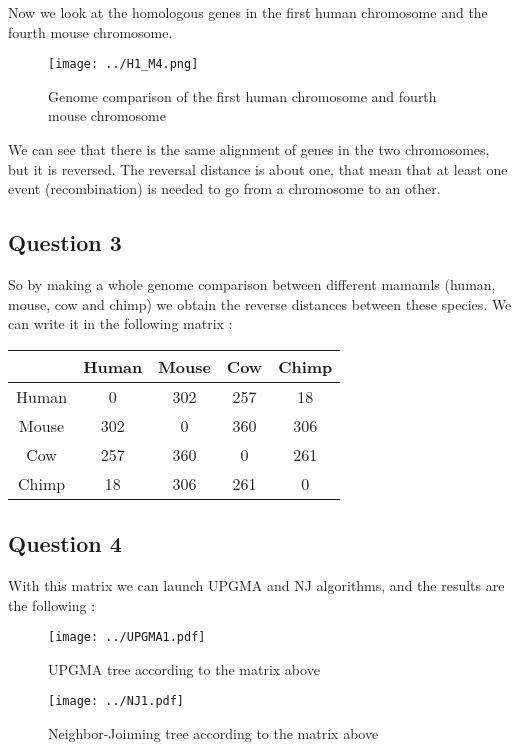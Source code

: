 \documentclass[]{article}
\theoremstyle{definition}
\begin{document}
Now we look at the homologous genes in the first human chromosome and the fourth mouse chromosome.
\begin{figure}[H]
	\texttt{[image: ../H1\_M4.png]}
	\caption{\label{h1_m4} Genome comparison of the first human chromosome and fourth mouse chromosome }
\end{figure}
	We can see that there is the same alignment of genes in the two chromosomes, but it is reversed. The reversal distance is about one, that mean that at least one event (recombination) is needed to go from a chromosome to an other.   

\subsection{Question 3}

	So by making a whole genome comparison between different mamamls (human, mouse, cow and chimp) we obtain the reverse distances between these species. We can write it in the following matrix :
	\\
	
\begin{tabular}{|*{5}{c|}}
	\hline
	   & Human  & Mouse  & Cow  & Chimp \\
	\hline
	Human  & 0  & 302  & 257  & 18 \\
	\hline
	Mouse  & 302  & 0  & 360 & 306 \\
	\hline
	Cow  & 257  & 360 & 0 & 261 \\
	\hline
	Chimp  & 18 & 306 & 261 & 0 \\
	\hline
	
\end{tabular}
 
\subsection{Question 4}


With this matrix we can launch UPGMA and NJ algorithms, and the results are the following :
 
\begin{figure}[h!]

	\texttt{[image: ../UPGMA1.pdf]}
	\caption{\label{upgma1} UPGMA tree according to the matrix above }
\end{figure}


\begin{figure}[h!!]
	\texttt{[image: ../NJ1.pdf]}
	\caption{\label{nj1} Neighbor-Joinning tree according to the matrix above }
\end{figure}
\end{document}
